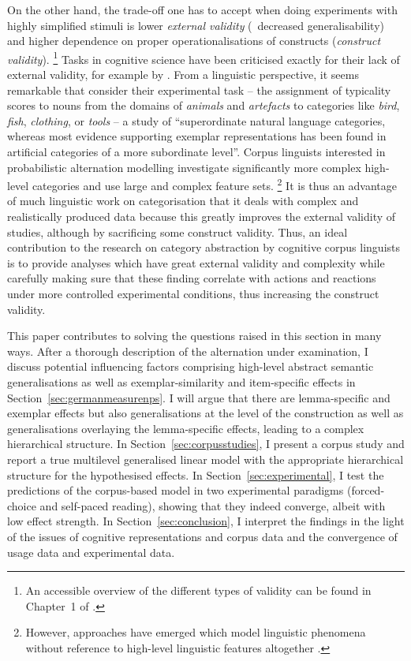 On the other hand, the trade-off one has to accept when doing experiments with highly simplified stimuli is lower \textit{external validity} (\ie\ decreased generalisability) and higher dependence on proper operationalisations of constructs (\textit{construct validity}).%
\footnote{An accessible overview of the different types of validity can be found in Chapter~1 of \citet{MaxwellDelaney2004}.}
Tasks in cognitive science have been criticised exactly for their lack of external validity, for example by \citet{Murphy2003}.
From a linguistic perspective, it seems remarkable that \citet[1013]{VoorspoelsEa2011} consider their experimental task -- the assignment of typicality scores to nouns from the domains of \textit{animals} and \textit{artefacts} to categories like \textit{bird}, \textit{fish}, \textit{clothing}, or \textit{tools} -- a study of ``superordinate natural language categories, whereas most evidence supporting exemplar representations has been found in artificial categories of a more subordinate level''.
Corpus linguists interested in probabilistic alternation modelling investigate significantly more complex high-level categories and use large and complex feature sets.%
\footnote{However, approaches have emerged which model linguistic phenomena without reference to high-level linguistic features altogether \citep{BaayenEa2016,RamscarPort2016}.}
It is thus an advantage of much linguistic work on categorisation that it deals with complex and realistically produced data because this greatly improves the external validity of studies, although by sacrificing some construct validity.
Thus, an ideal contribution to the research on category abstraction by cognitive corpus linguists is to provide analyses which have great external validity and complexity while carefully making sure that these finding correlate with actions and reactions under more controlled experimental conditions, thus increasing the construct validity.

This paper contributes to solving the questions raised in this section in many ways.
After a thorough description of the alternation under examination, I discuss potential influencing factors comprising high-level abstract semantic generalisations as well as exemplar-similarity and item-specific effects in Section~\ref{sec:germanmeasurenps}.
I will argue that there are lemma-specific and exemplar effects but also generalisations at the level of the construction as well as generalisations overlaying the lemma-specific effects, leading to a complex hierarchical structure.
In Section~\ref{sec:corpusstudies}, I present a corpus study and report a true multilevel generalised linear model with the appropriate hierarchical structure for the hypothesised effects.
In Section~\ref{sec:experimental}, I test the predictions of the corpus-based model in two experimental paradigms (forced-choice and self-paced reading), showing that they indeed converge, albeit with low effect strength.
In Section~\ref{sec:conclusion}, I interpret the findings in the light of the issues of cognitive representations and corpus data and the convergence of usage data and experimental data.

